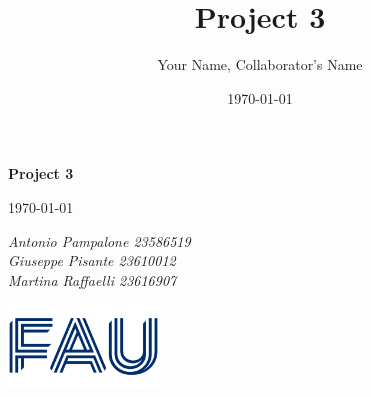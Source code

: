 \documentclass{article}
\title{Project 3}
\author{Your Name, Collaborator's Name}
\date{\today}
\begin{document}
\begin{titlepage}
    \centering
    \vspace*{1in}
    
    {\Huge\bfseries Project 3\par}
    \vspace{1.5cm}
    {\Large \today\par}
    \vspace{1.5cm}
    {\Large\itshape Antonio Pampalone 23586519 \\ Giuseppe Pisante 23610012\\ Martina Raffaelli 23616907 \par}
    
    \vfill
    \includegraphics[width=0.3\textwidth]{FAU-Logo.png}\par\vspace{1cm} %
   
\end{titlepage}

\newpage
\small
\end{document}
